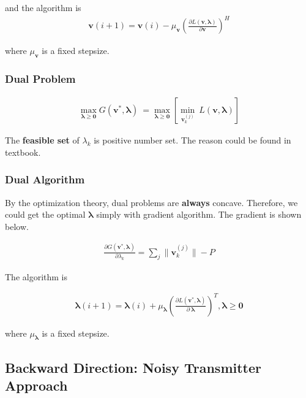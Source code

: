 \documentclass[11pt, oneside]{article}   	%
\begin{document}
and the algorithm is
\begin{align*}
\textbf{v}(i+1) = \textbf{v}(i) - \mu_\textbf{v} (\frac{\partial L( \textbf{v}, \pmb{\lambda} )}{\partial \textbf{v}})^{H}
\end{align*}

where $\mu_\textbf{v}$ is a fixed stepsize.







\subsubsection{Dual Problem}

\begin{align*}
\max_{	\pmb{\lambda} \geq \textbf{0}	}	G( \textbf{v}^{*}, \pmb{\lambda} ) \ = 
\max_{	\pmb{\lambda}	\geq \textbf{0}}
[
\min_{\textbf{v}_{k}^{(j)}}\
L( \textbf{v}, \pmb{\lambda} )]
\end{align*}

The \textbf{feasible set} of $\lambda_{k}$ is positive number set. The reason could be found in textbook. 

\subsubsection{Dual Algorithm}

By the optimization theory, dual problems are \textbf{always} concave. Therefore, we could get the optimal $\pmb{\lambda}$ simply with gradient algorithm. The gradient is shown below.


\begin{align*}
\frac{\partial G( \textbf{v}^{*}, \pmb{\lambda} )}{\partial \lambda_{k}} = 
\displaystyle\sum_{j}	\|	\textbf{v}^{(j)}_{k}	\|	-P
\end{align*}

The algorithm is 

\begin{align*}
 \pmb{\lambda} (i+1) =  \pmb{\lambda}(i) + \mu_{\pmb{\lambda}} (\frac{\partial L( \textbf{v}^{*}, \pmb{\lambda} )}{\partial \ \pmb{\lambda}})^{T},  \pmb{\lambda}	\geq \textbf{0}
\end{align*}

where $\mu_{\pmb{\lambda}}$ is a fixed stepsize.





\subsection{Backward Direction: Noisy Transmitter Approach}
\end{document}
